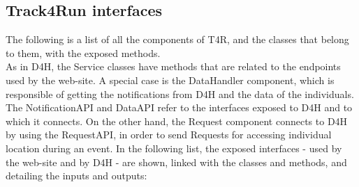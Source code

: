 \documentclass[a4paper, hidelinks, 12pt]{report}
\begin{document}
	
	\subsection{Track4Run interfaces}
	The following is a list of all the components of T4R, and the classes that belong to them, with the exposed methods. \\
	
		As in D4H, the Service classes have methods that are related to the endpoints used by the web-site. A special case is the DataHandler component, which is responsible of getting the notifications from D4H and the data of the individuals. The  NotificationAPI and DataAPI refer to the interfaces exposed to D4H and to which it connects. On the other hand, the Request component connects to D4H by using the RequestAPI, in order to send Requests for accessing individual location during an event. In the following list, the exposed interfaces - used by the web-site and by D4H - are shown, linked with the classes and methods, and detailing the inputs and outputs:
\end{document}
